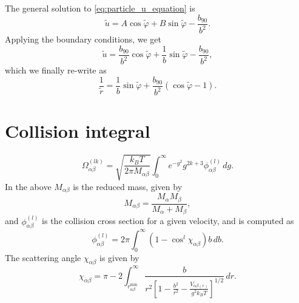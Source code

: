 \documentclass[a4paper,11pt]{report}
\begin{document}
The general solution to \cref{eq:particle_u_equation} is 
\begin{equation}
    \tilde{u} = A \cos \tilde{\varphi} + B \sin \tilde{\varphi} - \frac{b_{90}}{b^2}.
\end{equation}
Applying the boundary conditions, we get
\begin{equation}
    \tilde{u} = \frac{b_{90}}{b^2} \cos \tilde{\varphi} + \frac{1}{b} \sin \tilde{\varphi} - \frac{b_{90}}{b^2},
\end{equation}
which we finally re-write as
\begin{equation}
    \frac{1}{\tilde{r}} = \frac{1}{b} \sin \tilde{\varphi} + \frac{b_{90}}{b^2} \left ( \cos \tilde{\varphi} - 1 \right ).
\end{equation}

\section{Collision integral}
\begin{equation}
    \Omega_{\alpha \beta}^{(lk)} = \sqrt{ \frac{k_B T}{2 \pi M_{\alpha \beta}} } \int_0^\infty e^{-g^2} g^{2k+3} \phi_{\alpha \beta}^{(l)} \, dg.
\end{equation}
In the above $M_{\alpha \beta}$ is the reduced mass, given by
\begin{equation}
    M_{\alpha \beta} = \frac{M_\alpha M_\beta}{M_\alpha + M_\beta},
\end{equation}
and $\phi^{(l)}_{\alpha \beta}$ is the collision cross section for a given velocity, and is computed as
\begin{equation}
    \phi_{\alpha \beta}^{(l)} = 2 \pi \int_0^\infty \left ( 1 - \cos^l \chi_{\alpha \beta} \right ) b \, db.
\end{equation}
The scattering angle $\chi_{\alpha \beta}$ is given by
\begin{equation}
    \chi_{\alpha \beta} = \pi - 2 \int_{r_{\alpha \beta}^{\text{min}}}^\infty \frac{b}{r^2 \left [ 1 - \frac{b^2}{r^2} - \frac{V_{\alpha \beta (r)}}{g^2 k_B T} \right ]^{1/2} } \, dr.
\end{equation}
\end{document}
